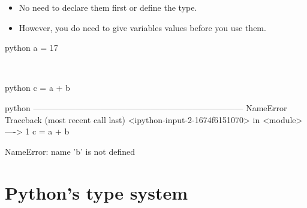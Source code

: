 \documentclass[aspectratio=1610,slidestop]{beamer}
\begin{document}
\begin{pframe}
 \vspace{-0.75cm}
 \begin{itemize}
  \item No need to declare them first or define the type.
  \item However, you do need to give variables values before you use them.
 \end{itemize}

 \begin{ipython}
  \begin{pythonin}{python}
a = 17
  \end{pythonin}
  \\
  \begin{pythonin}{python}
c = a + b
  \end{pythonin}
  \begin{pythonerr}{python}
---------------------------------------------------------------------------
NameError                                 Traceback (most recent call last)
<ipython-input-2-1674f6151070> in <module>
----> 1 c = a + b

NameError: name 'b' is not defined
  \end{pythonerr}
 \end{ipython}
\end{pframe}


\section{Python's type system}
\end{document}

